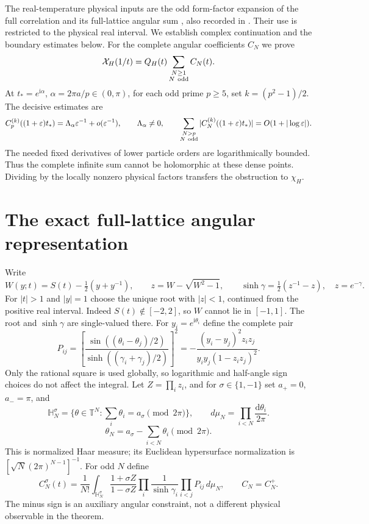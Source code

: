 \documentclass[11pt]{article}
\numberwithin{equation}{section}
\theoremstyle{remark}\newtheorem{remark}[theorem]{Remark}
\newcommand{\ii}{\mathrm i}
\newcommand{\dd}{\mathrm d}
\newcommand{\T}{\mathbb T}
\newcommand{\X}{\mathcal X_H}
\begin{document}
The real-temperature physical inputs are the odd form-factor
expansion of the full correlation and its full-lattice angular
sum \cite[eqs.~(1.9), (1.11), (3.13), (3.17)--(3.20),
(4.1)--(4.2)]{Orrick}, also recorded in
\cite[eqs.~(3), (5)--(9)]{Boukraa}. Their use is restricted to the
physical real interval. We establish complex continuation and the
boundary estimates below.
For the complete angular coefficients $C_N$ we prove
\[
 \X(1/t)=Q_H(t)\sum_{\substack{N\ge1\\N\ {\rm odd}}}C_N(t).
\]
At $t_*=e^{\ii\alpha}$, $\alpha=2\pi a/p\in(0,\pi)$, for each
odd prime $p\ge5$, set $k=(p^2-1)/2$. The decisive estimates are
\[
 C_p^{(k)}((1+\varepsilon)t_*)
       =\Lambda_\alpha\varepsilon^{-1}+o(\varepsilon^{-1}),
 \qquad \Lambda_\alpha\ne0,
 \qquad
 \sum_{\substack{N>p\\N\ {\rm odd}}}|C_N^{(k)}((1+\varepsilon)t_*)|
       =O(1+|\log\varepsilon|).
\]
The needed fixed derivatives of lower particle orders are logarithmically bounded.
Thus the complete infinite sum cannot be holomorphic at these dense
points. Dividing by the locally nonzero physical factors transfers
the obstruction to $\chi_H$.

\section{The exact full-lattice angular representation}
\label{sec:representation}\label{sec:angular-bulk}
Write
\[
 W(y;t)=S(t)-\tfrac12(y+y^{-1}),\qquad
 z=W-\sqrt{W^2-1},\qquad
 \sinh\gamma=\tfrac12(z^{-1}-z),\quad z=e^{-\gamma}.
\]
For $|t|>1$ and $|y|=1$ choose the unique root with $|z|<1$,
continued from the positive real interval. Indeed $S(t)\notin[-2,2]$,
so $W$ cannot lie in $[-1,1]$. The root and $\sinh\gamma$ are
single-valued there.
For $y_i=e^{\ii\theta_i}$ define the complete pair
\begin{equation}\label{eq:kernel-square}
 P_{ij}=
 \left[\frac{\sin((\theta_i-\theta_j)/2)}
 {\sinh((\gamma_i+\gamma_j)/2)}\right]^2
 =-\frac{(y_i-y_j)^2z_i z_j}{y_i y_j(1-z_i z_j)^2}.
\end{equation}
Only the rational square is used globally, so logarithmic and
half-angle sign choices do not affect the integral.
Let $Z=\prod_i z_i$, and for $\sigma\in\{1,-1\}$ set
$a_+=0$, $a_-=\pi$, and
\[
 \mathbb H_N^\sigma=\{\theta\in\T^N:\textstyle\sum_i\theta_i
                       =a_\sigma\pmod {2\pi}\},\qquad
 d\mu_N=\prod_{i<N}\frac{\dd\theta_i}{2\pi}.
\]
\[
 \theta_N=a_\sigma-\sum_{i<N}\theta_i\pmod {2\pi}.
\]
This is normalized Haar measure; its Euclidean hypersurface
normalization is $[\sqrt N(2\pi)^{N-1}]^{-1}$.
For odd $N$ define
\begin{equation}\label{eq:angular-bulk}
 C_N^\sigma(t)=\frac1{N!}\int_{\mathbb H_N^\sigma}
    \frac{1+\sigma Z}{1-\sigma Z}
    \prod_i\frac1{\sinh\gamma_i}\prod_{i<j}P_{ij}\,d\mu_N,
 \qquad C_N=C_N^+.
\end{equation}
The minus sign is an auxiliary angular constraint, not a different
physical observable in the theorem.
\end{document}
